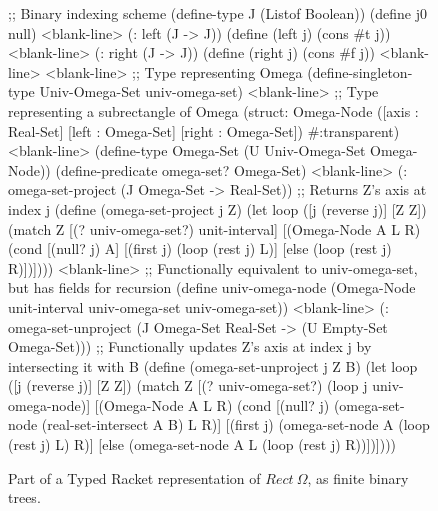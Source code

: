 \begin{figure}[p!]\centering
\begin{schemedisplay}
;; Binary indexing scheme
(define-type J (Listof Boolean))
(define j0 null)
<blank-line>
(: left (J -> J))
(define (left j) (cons #t j))
<blank-line>
(: right (J -> J))
(define (right j) (cons #f j))
<blank-line>
<blank-line>
;; Type representing Omega
(define-singleton-type Univ-Omega-Set univ-omega-set)
<blank-line>
;; Type representing a subrectangle of Omega
(struct: Omega-Node ([axis : Real-Set] [left : Omega-Set] [right : Omega-Set])
  #:transparent)
<blank-line>
(define-type Omega-Set (U Univ-Omega-Set Omega-Node))
(define-predicate omega-set? Omega-Set)
<blank-line>
(: omega-set-project (J Omega-Set -> Real-Set))
;; Returns Z's axis at index j
(define (omega-set-project j Z)
  (let loop ([j  (reverse j)] [Z Z])
    (match Z
      [(? univ-omega-set?)  unit-interval]
      [(Omega-Node A L R)
       (cond [(null? j)  A]
             [(first j)  (loop (rest j) L)]
             [else       (loop (rest j) R)])])))
<blank-line>
;; Functionally equivalent to univ-omega-set, but has fields for recursion
(define univ-omega-node
  (Omega-Node unit-interval univ-omega-set univ-omega-set))
<blank-line>
(: omega-set-unproject (J Omega-Set Real-Set -> (U Empty-Set Omega-Set)))
;; Functionally updates Z's axis at index j by intersecting it with B
(define (omega-set-unproject j Z B)
  (let loop ([j  (reverse j)] [Z Z])
    (match Z
      [(? univ-omega-set?)  (loop j univ-omega-node)]
      [(Omega-Node A L R)
       (cond [(null? j)  (omega-set-node (real-set-intersect A B) L R)]
             [(first j)  (omega-set-node A (loop (rest j) L) R)]
             [else       (omega-set-node A L (loop (rest j) R))])])))
\end{schemedisplay}
\bottomhrule
\caption[Typed Racket representation of $\mathsf{Rect}~\Omega$]{Part of a Typed Racket representation of $Rect~\Omega$, as finite binary trees.}
\label{fig:tree-rectangle-implementation}
\end{figure}


